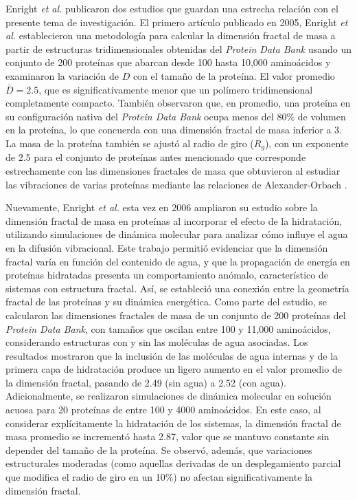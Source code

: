 Enright \textit{et al.} publicaron dos estudios que guardan una estrecha relaci\'{o}n con el presente tema de investigaci\'{o}n. El primero art\'{i}culo publicado en 2005, Enright \textit{et al.}
\cite{Enright2005} establecieron una metodolog\'{i}a  para calcular la dimensi\'{o}n fractal de masa a partir de estructuras tridimensionales obtenidas del \textit{Protein Data Bank} usando un conjunto de 200 prote\'{i}nas que abarcan desde 100 hasta 10,000 amino\'{a}cidos y examinaron la variaci\'{o}n de $D$ con el tamaño de la prote\'{i}na. El valor promedio $\bar{D} = 2.5$, que es significativamente menor que un pol\'{i}mero tridimensional completamente compacto. Tambi\'{e}n observaron que, en promedio, una prote\'{i}na en su configuraci\'{o}n nativa del \textit{Protein Data Bank} ocupa menos del $80\%$ de volumen en la prote\'{i}na, lo que concuerda con una dimensi\'{o}n fractal de masa inferior a 3. La masa de la prote\'{i}na tambi\'{e}n se ajust\'{o} al radio de giro ($R_g$), con un exponente de 2.5 para el conjunto de prote\'{i}nas antes mencionado que corresponde estrechamente con las dimensiones fractales de masa que obtuvieron al estudiar las vibraciones de varias prote\'{i}nas mediante las relaciones de Alexander-Orbach \cite{Alexander1982}.
 
 Nuevamente, Enright \textit{et al.}\cite{Enright2006} esta vez en 2006 ampliaron su estudio sobre la dimensi\'{o}n fractal de masa en prote\'{i}nas al incorporar el efecto de la hidrataci\'{o}n, utilizando simulaciones de din\'{a}mica molecular para analizar c\'{o}mo influye el agua en la difusi\'{o}n vibracional. Este trabajo permiti\'{o} evidenciar que la dimensi\'{o}n fractal var\'{i}a en funci\'{o}n del contenido de agua, y que la propagaci\'{o}n de energ\'{i}a en prote\'{i}nas hidratadas presenta un comportamiento an\'{o}malo, caracter\'{i}stico de sistemas con estructura fractal. As\'{i}, se estableci\'{o} una conexi\'{o}n entre la geometr\'{i}a fractal de las prote\'{i}nas y su din\'{a}mica energ\'{e}tica. Como parte del estudio, se calcularon las dimensiones fractales de masa de un conjunto de 200 prote\'{i}nas del \textit{Protein Data Bank}, con tamaños que oscilan entre 100 y 11,000 amino\'{a}cidos, considerando estructuras con y sin las mol\'{e}culas de agua asociadas. Los resultados mostraron que la inclusi\'{o}n de las mol\'{e}culas de agua internas y de la primera capa de hidrataci\'{o}n produce un ligero aumento en el valor promedio de la dimensi\'{o}n fractal, pasando de 2.49 (sin agua) a 2.52 (con agua). Adicionalmente, se realizaron simulaciones de din\'{a}mica molecular en soluci\'{o}n acuosa para 20 prote\'{i}nas de entre 100 y 4000 amino\'{a}cidos. En este caso, al considerar expl\'{i}citamente la hidrataci\'{o}n de los sistemas, la dimensi\'{o}n fractal de masa promedio se increment\'{o} hasta 2.87, valor que se mantuvo constante sin depender del tamaño de la prote\'{i}na. Se observ\'{o}, adem\'{a}s, que variaciones estructurales moderadas (como aquellas derivadas de un desplegamiento parcial que modifica el radio de giro en un 10\%) no afectan significativamente la dimensi\'{o}n fractal.

